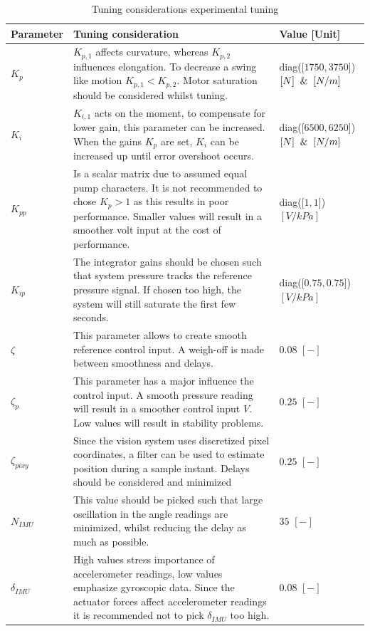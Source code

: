 \begin{table}[H]
    \centering
     \caption{Tuning considerations experimental tuning}
    \begin{tabular}{p{2.5cm} p{9cm} p{3cm}} \hline
      \textbf{Parameter}   & \textbf{Tuning  consideration} & \textbf{Value [Unit]} \\ \hline
      $K_p$   &   $K_{p,1}$ affects curvature, whereas $K_{p,2}$ influences elongation. To decrease a swing like motion $K_{p,1} < K_{p,2}$. Motor saturation should be considered whilst tuning.   &  diag([$1750,3750$])     $[N] \And [N/m]$        \\ \hline
      $K_i$   &   $K_{i,1}$ acts on the moment, to compensate for lower gain, this parameter can be increased. When the gains $K_p$ are set, $K_i$ can be increased up until error overshoot occurs.   &  diag([$6500,6250$])  $[N] \And [N/m]$     \\ \hline
      $K_{pp}$   &  Is a scalar matrix due to assumed equal pump characters. It is not recommended to chose $K_p >1$ as this results in poor performance. Smaller values will result in a smoother volt input at the cost of performance.  &  diag([$1 ,1$]) $[V/kPa]$      \\ \hline
      $K_{ip}$   &  The integrator gains should be chosen such that system pressure tracks the reference pressure signal. If chosen too high, the system will still saturate the first few seconds.      &  diag([$0.75,0.75$]) $[V/kPa]$   \\ \hline
      $\zeta$    &   This parameter allows to create smooth reference control input. A weigh-off is made between smoothness and delays. &  $0.08$ $[-]$ \\ \hline
      $\zeta_p$    &   This parameter has a major influence the control input. A smooth pressure reading will result in a smoother control input $V$. Low values will result in stability problems.   & $0.25$ $[-]$  \\ \hline
      $\zeta_{pixy}$    &  Since the vision system uses discretized pixel coordinates, a filter can be used to estimate position during a sample instant. Delays should be considered and minimized     & $0.25$  $[-]$ \\ \hline
      $N_{IMU}$    &  This value should be picked such that large oscillation in the angle readings are minimized, whilst reducing the delay as much as possible. & $35$ $[-]$  \\ \hline
      $\delta_{IMU}$    &  High values stress importance of accelerometer readings, low values emphasize gyroscopic data. Since the actuator forces affect accelerometer readings it is recommended not to pick $\delta_{IMU}$ too high.  & $0.08$ $[-]$ \\ \hline
    \end{tabular}

    \label{tab5:tuningcosiderations}
\end{table}



